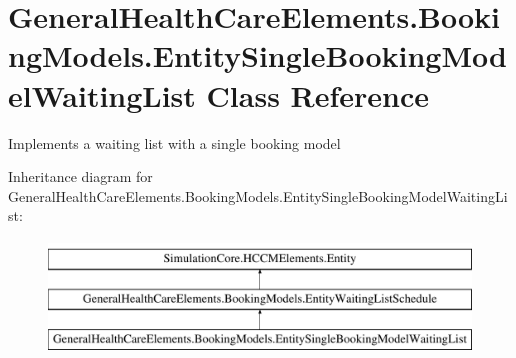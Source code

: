 \hypertarget{class_general_health_care_elements_1_1_booking_models_1_1_entity_single_booking_model_waiting_list}{}\section{General\+Health\+Care\+Elements.\+Booking\+Models.\+Entity\+Single\+Booking\+Model\+Waiting\+List Class Reference}
\label{class_general_health_care_elements_1_1_booking_models_1_1_entity_single_booking_model_waiting_list}


Implements a waiting list with a single booking model  


Inheritance diagram for General\+Health\+Care\+Elements.\+Booking\+Models.\+Entity\+Single\+Booking\+Model\+Waiting\+List\+:\begin{figure}[H]
\begin{center}
\leavevmode
\includegraphics[height=3.000000cm]{class_general_health_care_elements_1_1_booking_models_1_1_entity_single_booking_model_waiting_list}
\end{center}
\end{figure}
